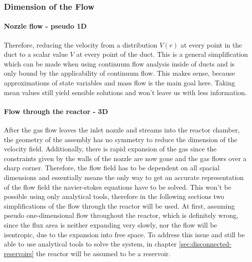 \subsubsection*{Dimension of the Flow}

	\paragraph{Nozzle flow - pseudo 1D}
		Therefore, reducing the velocity from a distribution $V(r)$ at every point in the duct to a scalar value $V$ at every point of the duct.
		This is a general simplification which can be made when using continuum flow analysis inside of ducts and is only bound by the applicability of continuum flow.
		This makes sense, because approximations of state variables and mass flow is the main goal here.
		Taking mean values still yield sensible solutions and won't leave us with less information.

	\paragraph*{Flow through the reactor - 3D}
		After the gas flow leaves the inlet nozzle and streams into the reactor chamber, the geometry of the assembly has no symmetry to reduce the dimension of the velocity field.
		Additionally, there is rapid expansion of the gas since the constraints given by the walls of the nozzle are now gone and the gas flows over a sharp corner.
		Therefore, the flow field has to be dependent on all spacial dimensions and essentially means the only way to get an accurate representation of the flow field the navier-stokes equations have to be solved.
		This won't be possible using only analytical tools, therefore in the following sections two simplifications of the flow through the reactor will be used.
		At first, assuming pseudo one-dimensional flow throughout the reactor, which is definitely wrong, since the flux area is neither expanding very slowly, nor the flow will be isentropic, due to the expansion into free space.
		To address this issue and still be able to use analytical tools to solve the system, in chapter \ref{sec:disconnected-reservoirs} the reactor will be assumed to be a reservoir.

